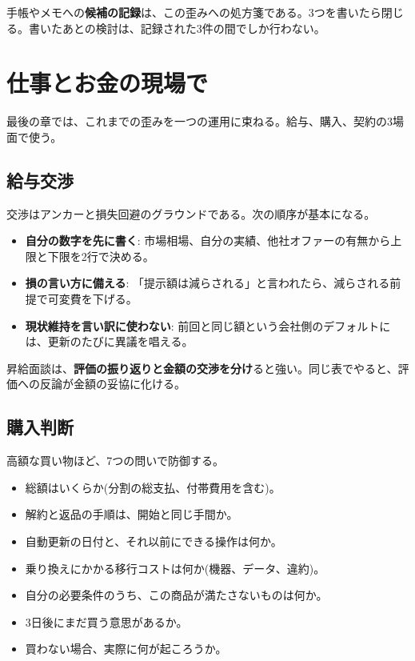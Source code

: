 \documentclass{article}
\begin{document}
手帳やメモへの\textbf{候補の記録}は、この歪みへの処方箋である。3つを書いたら閉じる。書いたあとの検討は、記録された3件の間でしか行わない。

\section{仕事とお金の現場で}

最後の章では、これまでの歪みを一つの運用に束ねる。給与、購入、契約の3場面で使う。

\subsection{給与交渉}

交渉はアンカーと損失回避のグラウンドである。次の順序が基本になる。

\begin{itemize}
\item \textbf{自分の数字を先に書く}: 市場相場、自分の実績、他社オファーの有無から上限と下限を2行で決める。
\item \textbf{損の言い方に備える}: 「提示額は減らされる」と言われたら、減らされる前提で可変費を下げる。
\item \textbf{現状維持を言い訳に使わない}: 前回と同じ額という会社側のデフォルトには、更新のたびに異議を唱える。
\end{itemize}

昇給面談は、\textbf{評価の振り返りと金額の交渉を分け}ると強い。同じ表でやると、評価への反論が金額の妥協に化ける。

\subsection{購入判断}

高額な買い物ほど、7つの問いで防御する。

\begin{itemize}
\item 総額はいくらか(分割の総支払、付帯費用を含む)。
\item 解約と返品の手順は、開始と同じ手間か。
\item 自動更新の日付と、それ以前にできる操作は何か。
\item 乗り換えにかかる移行コストは何か(機器、データ、違約)。
\item 自分の必要条件のうち、この商品が満たさないものは何か。
\item 3日後にまだ買う意思があるか。
\item 買わない場合、実際に何が起ころうか。
\end{itemize}
\end{document}

